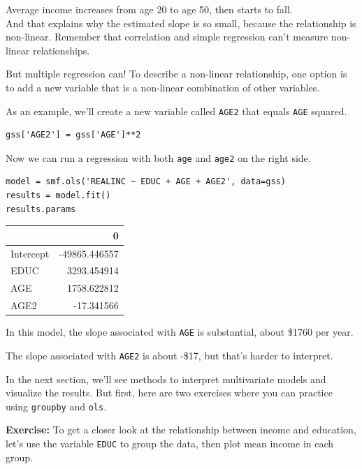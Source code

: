 Average income increases from age 20 to age 50, then starts to fall.\\
And that explains why the estimated slope is so small, because the
relationship is non-linear. Remember that correlation and simple
regression can't measure non-linear relationships.

But multiple regression can! To describe a non-linear relationship, one
option is to add a new variable that is a non-linear combination of
other variables.

As an example, we'll create a new variable called
\passthrough{\lstinline!AGE2!} that equals \passthrough{\lstinline!AGE!}
squared.

\begin{lstlisting}[]
gss['AGE2'] = gss['AGE']**2
\end{lstlisting}

Now we can run a regression with both \passthrough{\lstinline!age!} and
\passthrough{\lstinline!age2!} on the right side.

\begin{lstlisting}[]
model = smf.ols('REALINC ~ EDUC + AGE + AGE2', data=gss)
results = model.fit()
results.params
\end{lstlisting}

\begin{tabular}{lr}
\midrule
{} &             0 \\
\midrule
Intercept & -49865.446557 \\
EDUC      &   3293.454914 \\
AGE       &   1758.622812 \\
AGE2      &    -17.341566 \\
\midrule
\end{tabular}

In this model, the slope associated with \passthrough{\lstinline!AGE!}
is substantial, about \$1760 per year.

The slope associated with \passthrough{\lstinline!AGE2!} is about -\$17,
but that's harder to interpret.

In the next section, we'll see methods to interpret multivariate models
and visualize the results. But first, here are two exercises where you
can practice using \passthrough{\lstinline!groupby!} and
\passthrough{\lstinline!ols!}.

\textbf{Exercise:} To get a closer look at the relationship between
income and education, let's use the variable
\passthrough{\lstinline!EDUC!} to group the data, then plot mean income
in each group.


